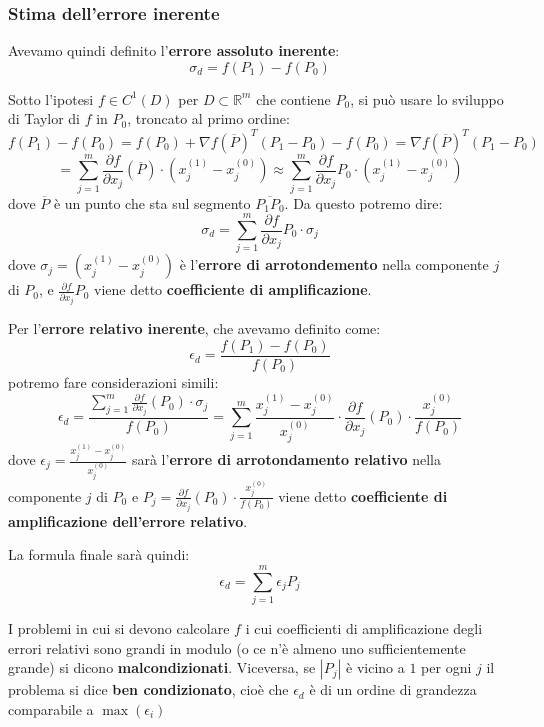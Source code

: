 \documentclass[a4paper,11pt]{article}
\begin{document}
\subsubsection{Stima dell'errore inerente}
Avevamo quindi definito l'\textbf{errore assoluto inerente}:
$$
\sigma_d = f(P_1) - f(P_0)
$$

Sotto l'ipotesi $f \in C^1(D)$ per $D \subset \mathbb{R}^m$ che contiene $P_0$, si può usare  lo sviluppo di Taylor di $f$ in $P_0$, troncato al primo ordine:
$$
f(P_1) - f(P_0) = f(P_0) + \nabla f(\overline{P})^T (P_1 - P_0) - f(P_0) = \nabla f(\overline{P})^T (P_1 - P_0)
$$
$$
= \sum_{j=1}^m \frac{\partial f}{\partial x_j}(\overline{P}) \cdot \left(x_j^{(1)} - x_j^{(0)}\right)
\approx \sum_{j=1}^m \frac{\partial f}{\partial x_j}{P_0} \cdot \left(x_j^{(1)} - x_j^{(0)}\right)
$$
dove $\overline{P}$ è un punto che sta sul segmento $\overline{P_1 P_0}$.
Da questo potremo dire:
$$
\sigma_d = \sum_{j=1}^m \frac{\partial f}{\partial x_j}{P_0} \cdot \sigma_j
$$
dove $\sigma_j = \left(x_j^{(1)} - x_j^{(0)}\right)$ è l'\textbf{errore di arrotondemento} nella componente $j$ di $P_0$, e $\frac{\partial f}{\partial x_j}{P_0}$ viene detto \textbf{coefficiente di amplificazione}.

\par\smallskip

Per l'\textbf{errore relativo inerente}, che avevamo definito come:
$$
\epsilon_d = \frac{f(P_1) - f(P_0)}{f(P_0)}
$$
potremo fare considerazioni simili: 
$$
\epsilon_d = \frac{ \sum_{j=1}^{m} \frac{\partial f}{\partial x_j} (P_0) \cdot \sigma_j }{f(P_0)} = \sum_{j=1}^m \frac{ x_j^{(1)} - x_j^{(0)} }{x_j^{(0)}} \cdot \frac{\partial f}{\partial x_j} (P_0) \cdot \frac{x_j^{(0)}}{f(P_0)}  
$$
dove $\epsilon_j = \frac{ x_j^{(1)} - x_j^{(0)} }{x_j^{(0)}}$ sarà l'\textbf{errore di arrotondamento relativo} nella componente $j$ di $P_0$ e $P_j = \frac{\partial f}{\partial x_j} (P_0) \cdot \frac{x_j^{(0)}}{f(P_0)}$ viene detto \textbf{coefficiente di amplificazione dell'errore relativo}.

La formula finale sarà quindi:
$$
\epsilon_d = \sum_{j=1}^m \epsilon_j P_j
$$

I problemi in cui si devono calcolare $f$ i cui coefficienti di amplificazione degli errori relativi sono grandi in modulo (o ce n'è almeno uno sufficientemente grande) si dicono \textbf{malcondizionati}.
Viceversa, se $|P_j|$ è vicino a $1$ per ogni $j$ il problema si dice \textbf{ben condizionato}, cioè che $\epsilon_d$ è di un ordine di grandezza comparabile a $\max(\epsilon_i)$
\end{document}
